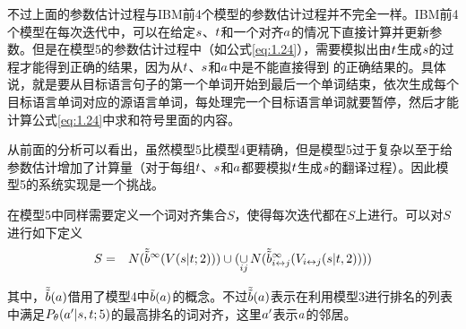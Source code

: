 \begin{appendices}
\parinterval 不过上面的参数估计过程与IBM前4个模型的参数估计过程并不完全一样。IBM前4个模型在每次迭代中，可以在给定${s}$、${t}$和一个对齐${a}$的情况下直接计算并更新参数。但是在模型5的参数估计过程中（如公式\eqref{eq:1.24}），需要模拟出由${t}$生成${s}$的过程才能得到正确的结果，因为从${t}$、${s}$和${a}$中是不能直接得到 的正确结果的。具体说，就是要从目标语言句子的第一个单词开始到最后一个单词结束，依次生成每个目标语言单词对应的源语言单词，每处理完一个目标语言单词就要暂停，然后才能计算公式\eqref{eq:1.24}中求和符号里面的内容。

\parinterval 从前面的分析可以看出，虽然模型5比模型4更精确，但是模型5过于复杂以至于给参数估计增加了计算量（对于每组${t}$、${s}$和${a}$都要模拟${t}$生成${s}$的翻译过程）。因此模型5的系统实现是一个挑战。

\parinterval 在模型5中同样需要定义一个词对齐集合$S$，使得每次迭代都在$S$上进行。可以对$S$进行如下定义
\begin{eqnarray}
S &=& N(\tilde{\tilde{b}}^{\infty}(V({s}|{t};2))) \cup (\mathop{\cup}\limits_{ij} N(\tilde{\tilde{b}}_{i \leftrightarrow j}^{\infty}(V_{i \leftrightarrow j}({s}|{t},2))))
\label{eq:1.29}
\end{eqnarray}
\vspace{0.5em}

\noindent 其中，$\tilde{\tilde{b}}({a})$借用了模型4中$\tilde{b}({a})$的概念。不过$\tilde{\tilde{b}}({a})$表示在利用模型3进行排名的列表中满足${P}_{\theta}({a}'|{s},{t};5)$的最高排名的词对齐，这里${a}'$表示${a}$的邻居。
\end{appendices}














